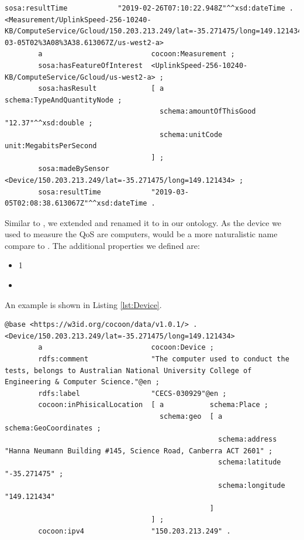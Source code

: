 \begin{lstlisting}[caption={Measurements},label={lst:Measurements}]
        sosa:resultTime            "2019-02-26T07:10:22.948Z"^^xsd:dateTime .
<Measurement/UplinkSpeed-256-10240-KB/ComputeService/Gcloud/150.203.213.249/lat=-35.271475/long=149.121434/2019-03-05T02%3A08%3A38.613067Z/us-west2-a>
        a                          cocoon:Measurement ;
        sosa:hasFeatureOfInterest  <UplinkSpeed-256-10240-KB/ComputeService/Gcloud/us-west2-a> ;
        sosa:hasResult             [ a                        schema:TypeAndQuantityNode ;
                                     schema:amountOfThisGood  "12.37"^^xsd:double ;
                                     schema:unitCode          unit:MegabitsPerSecond
                                   ] ;
        sosa:madeBySensor          <Device/150.203.213.249/lat=-35.271475/long=149.121434> ;
        sosa:resultTime            "2019-03-05T02:08:38.613067Z"^^xsd:dateTime .
\end{lstlisting}

\label{sec:Device}
Similar to , we extended  and renamed it to  in our ontology. As the device we used to measure the QoS are computers,  would be a more naturalistic name compare to .
The additional properties we defined are:
\begin{itemize}
  \item[]   1 
  \item[]   
\end{itemize}

An example is shown in Listing \ref{lst:Device}.

\begin{lstlisting}[caption={Device},label={lst:Device}]
@base <https://w3id.org/cocoon/data/v1.0.1/> .
<Device/150.203.213.249/lat=-35.271475/long=149.121434>
        a                          cocoon:Device ;
        rdfs:comment               "The computer used to conduct the tests, belongs to Australian National University College of Engineering & Computer Science."@en ;
        rdfs:label                 "CECS-030929"@en ;
        cocoon:inPhisicalLocation  [ a           schema:Place ;
                                     schema:geo  [ a                 schema:GeoCoordinates ;
                                                   schema:address    "Hanna Neumann Building #145, Science Road, Canberra ACT 2601" ;
                                                   schema:latitude   "-35.271475" ;
                                                   schema:longitude  "149.121434"
                                                 ]
                                   ] ;
        cocoon:ipv4                "150.203.213.249" .
\end{lstlisting}

